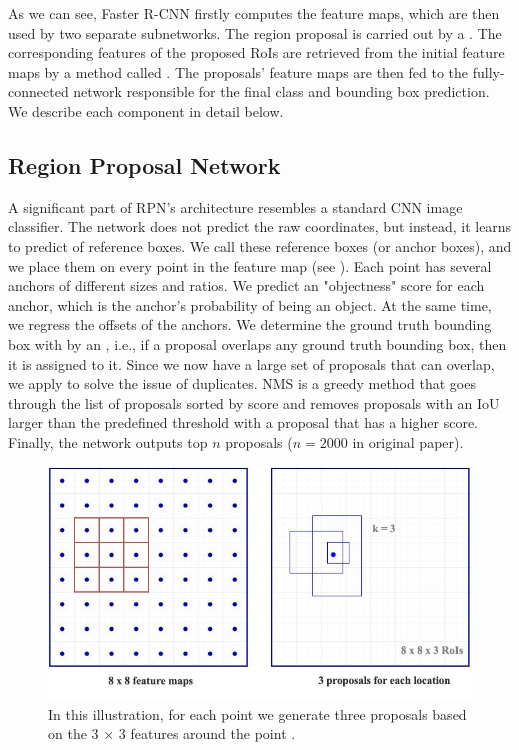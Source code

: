 As we can see, Faster R-CNN firstly computes the feature maps, which are
then used by two separate subnetworks. The region proposal is carried out
by a . The corresponding features of
the proposed RoIs are retrieved from the initial feature maps by a method
called . The proposals' feature maps are then fed to the
fully-connected network responsible for the final class and bounding box
prediction. We describe each component in detail below.

\subsection{Region Proposal Network}\label{rpn}
A significant part of RPN's architecture resembles a standard CNN image
classifier. The network does not predict the raw coordinates, but instead,
it learns to predict  of reference boxes. We call these reference
boxes  (or anchor boxes), and we place them on every point in the
feature map (see ). Each point has several anchors of
different sizes and ratios. We predict an "objectness" score for each anchor,
which is the anchor's probability of being an object. At the same time, we
regress the offsets of the anchors. We determine the ground truth bounding
box with by an , i.e., if a proposal overlaps any ground
truth bounding box, then it is assigned to it. Since we now have a large set
of proposals that can overlap, we apply 
to solve the issue of duplicates. NMS is a greedy method that goes through
the list of proposals sorted by score and removes proposals with an IoU larger
than the predefined threshold with a proposal that has a higher score. Finally,
the network outputs top $n$ proposals ($n = 2000$ in original paper).

\begin{figure}[h]
    \centering
    \includegraphics[width=0.6\linewidth]{Sources/Figures/rpn.jpeg}
    \caption{In this illustration, for each point we generate three proposals
        based on the 3 $\times$ 3 features around the point \cite{huifasterrcnn}.}
    \label{fig:rpn}
\end{figure}

